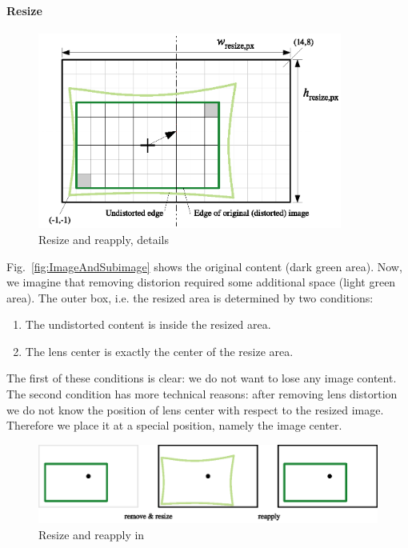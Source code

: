 \documentclass[10pt,a4paper]{article}
\begin{document}
\paragraph{Resize}
\begin{figure}[ht]
\centering
\includegraphics[width=10cm]{resize.eps}
\caption{Resize and reapply, details}
\label{fig:ResizeAndReapply}
\end{figure}
Fig.~\ref{fig:ImageAndSubimage} shows the original content (dark green area).
Now, we imagine that removing distorion required some additional space (light green area).
The outer box, i.e. the resized area is determined by two conditions:
\begin{enumerate}
\item The undistorted content is inside the resized area.
\item The lens center is exactly the center of the resize area.
\end{enumerate}
The first of these conditions is clear: we do not want to lose any image content.
The second condition has more technical reasons: after removing lens distortion
we do not know the position of lens center with respect to the resized image.
Therefore we place it at a special position, namely the image center.
\begin{figure}[ht]
\centering
\includegraphics[width=12.5cm]{rrr_workflow.eps}
\caption{Resize and reapply in \warp}
\label{fig:RRRWorkflow}
\end{figure}
\end{document}
